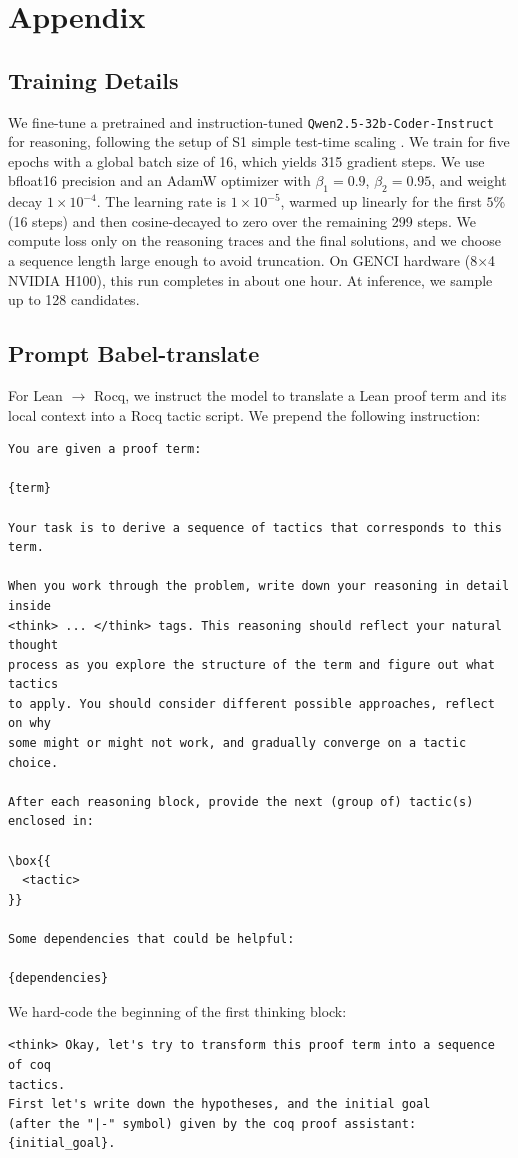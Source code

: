 \documentclass{article}
\begin{document}




\newpage

\appendix

\section{Appendix}


\subsection{Training Details}
\label{app:training}
We fine-tune a pretrained and instruction-tuned \texttt{Qwen2.5-32b-Coder-Instruct}\cite{deepseek2024} for reasoning, following the setup of S1 simple test-time scaling \cite{s12025}. We train for five epochs with a global batch size of 16, which yields 315 gradient steps. We use bfloat16 precision and an AdamW optimizer with $\beta_1=0.9$, $\beta_2=0.95$, and weight decay $1\times 10^{-4}$. The learning rate is $1\times 10^{-5}$, warmed up linearly for the first $5\%$ (16 steps) and then cosine-decayed to zero over the remaining 299 steps. We compute loss only on the reasoning traces and the final solutions, and we choose a sequence length large enough to avoid truncation. On GENCI hardware (8$\times$4 NVIDIA H100), this run completes in about one hour.
At inference, we sample up to 128 candidates.


\subsection{Prompt Babel-translate}
\label{app:promptbabel}
For Lean $\to$ Rocq, we instruct the model to translate a Lean proof term and its local context into a Rocq tactic script. We prepend the following instruction:
\begin{verbatim}
You are given a proof term:

{term}

Your task is to derive a sequence of tactics that corresponds to this term.

When you work through the problem, write down your reasoning in detail inside
<think> ... </think> tags. This reasoning should reflect your natural thought
process as you explore the structure of the term and figure out what tactics
to apply. You should consider different possible approaches, reflect on why 
some might or might not work, and gradually converge on a tactic choice.

After each reasoning block, provide the next (group of) tactic(s) enclosed in:

\box{{
  <tactic>
}}

Some dependencies that could be helpful:

{dependencies}
\end{verbatim}
We hard-code the beginning of the first thinking block:
\begin{verbatim}
<think> Okay, let's try to transform this proof term into a sequence of coq
tactics.
First let's write down the hypotheses, and the initial goal
(after the "|-" symbol) given by the coq proof assistant:
{initial_goal}.
\end{verbatim}
\end{document}
